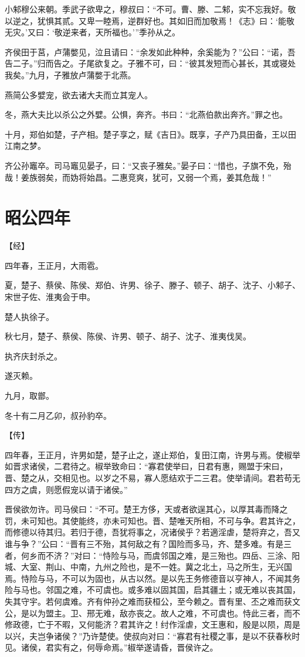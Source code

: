 \documentclass[a4paper,12pt,UTF8,twoside]{ctexbook}
\begin{document}
小邾穆公来朝。季武子欲卑之，穆叔曰：“不可。曹、滕、二邾，实不忘我好。敬以逆之，犹惧其贰。又卑一睦焉，逆群好也。其如旧而加敬焉！《志》曰：‘能敬无灾。’又曰：‘敬逆来者，天所福也。’”季孙从之。

齐侯田于莒，卢蒲嫳见，泣且请曰：“余发如此种种，余奚能为？”公曰：“诺，吾告二子。”归而告之。子尾欲复之。子雅不可，曰：“彼其发短而心甚长，其或寝处我矣。”九月，子雅放卢蒲嫳于北燕。

燕简公多嬖宠，欲去诸大夫而立其宠人。

冬，燕大夫比以杀公之外嬖。公惧，奔齐。书曰：“北燕伯款出奔齐。”罪之也。

十月，郑伯如楚，子产相。楚子享之，赋《吉日》。既享，子产乃具田备，王以田江南之梦。

齐公孙竈卒。司马竈见晏子，曰：“又丧子雅矣。”晏子曰：“惜也，子旗不免，殆哉！姜族弱矣，而妫将始昌。二惠竞爽，犹可，又弱一个焉，姜其危哉！”


\section{昭公四年}



【经】

四年春，王正月，大雨雹。

夏，楚子、蔡侯、陈侯、郑伯、许男、徐子、滕子、顿子、胡子、沈子、小邾子、宋世子佐、淮夷会于申。

楚人执徐子。

秋七月，楚子、蔡侯、陈侯、许男、顿子、胡子、沈子、淮夷伐吴。

执齐庆封杀之。

遂灭赖。

九月，取鄫。

冬十有二月乙卯，叔孙豹卒。

【传】

四年春，王正月，许男如楚，楚子止之，遂止郑伯，复田江南，许男与焉。使椒举如晋求诸侯，二君待之。椒举致命曰：“寡君使举曰，日君有惠，赐盟于宋曰，晋、楚之从，交相见也。以岁之不易，寡人愿结欢于二三君。使举请间。君若苟无四方之虞，则愿假宠以请于诸侯。”

晋侯欲勿许。司马侯曰：“不可。楚王方侈，天或者欲逞其心，以厚其毒而降之罚，未可知也。其使能终，亦未可知也。晋、楚唯天所相，不可与争。君其许之，而修德以待其归。若归于德，吾犹将事之，况诸侯乎？若適淫虐，楚将弃之，吾又谁与争？”公曰：“晋有三不殆，其何敌之有？国险而多马，齐、楚多难。有是三者，何乡而不济？”对曰：“恃险与马，而虞邻国之难，是三殆也。四岳、三涂、阳城、大室、荆山、中南，九州之险也，是不一姓。冀之北土，马之所生，无兴国焉。恃险与马，不可以为固也，从古以然。是以先王务修德音以亨神人，不闻其务险与马也。邻国之难，不可虞也。或多难以固其国，启其疆土；或无难以丧其国，失其守宇。若何虞难。齐有仲孙之难而获桓公，至今赖之。晋有里、丕之难而获文公，是以为盟主。卫、邢无难，敌亦丧之。故人之难，不可虞也。恃此三者，而不修政德，亡于不暇，又何能济？君其许之！纣作淫虐，文王惠和，殷是以陨，周是以兴，夫岂争诸侯？”乃许楚使。使叔向对曰：“寡君有社稷之事，是以不获春秋时见。诸侯，君实有之，何辱命焉。”椒举遂请昏，晋侯许之。
\end{document}
